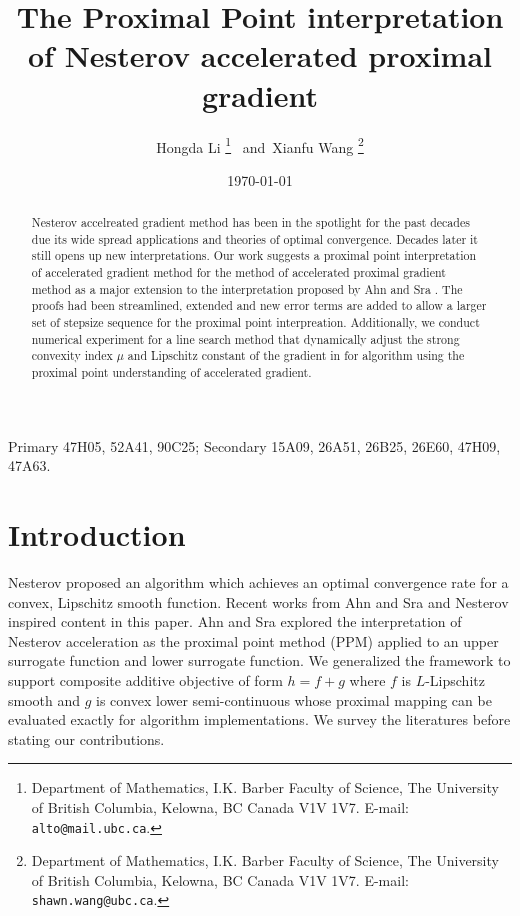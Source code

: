 \documentclass[12pt]{article}
\begin{document}
\title{{\selectfont The Proximal Point interpretation of Nesterov accelerated proximal gradient}}

\author{
    Hongda Li
    \thanks{Department of Mathematics, I.K. Barber Faculty of Science,
    The University of British Columbia, Kelowna, BC Canada V1V 1V7. E-mail:  \texttt{alto@mail.ubc.ca}.}~ and~Xianfu Wang
    \thanks{Department of Mathematics, I.K. Barber Faculty of Science,
    The University of British Columbia, Kelowna, BC Canada V1V 1V7. E-mail:  \texttt{shawn.wang@ubc.ca}.}
}

\date{\today}

\maketitle


\begin{abstract} 
    \noindent
    Nesterov accelreated gradient method has been in the spotlight for the past decades due its wide spread applications and theories of optimal convergence. 
    Decades later it still opens up new interpretations. 
    Our work suggests a proximal point interpretation of accelerated gradient method for the method of accelerated proximal gradient method as a major extension to the interpretation proposed by Ahn and Sra \cite{ahn_understanding_2022}. 
    The proofs had been streamlined, extended and new error terms are added to allow a larger set of stepsize sequence for the proximal point interpreation. 
    Additionally, we conduct numerical experiment for a line search method that dynamically adjust the strong convexity index $\mu$ and Lipschitz constant of the gradient in for algorithm  using the proximal point understanding of accelerated gradient. 
    
\end{abstract}

Primary 47H05, 52A41, 90C25; Secondary 15A09, 26A51, 26B25, 26E60, 47H09, 47A63.

\section{Introduction}
    
    Nesterov \cite{nesterov_method_1983} proposed an algorithm which achieves an optimal convergence rate for a convex, Lipschitz smooth function. 
    Recent works from Ahn and Sra \cite{ahn_understanding_2022} and Nesterov \cite{nesterov_lectures_2018} inspired content in this paper.
    Ahn and Sra explored the interpretation of Nesterov acceleration as the proximal point method (PPM) applied to an upper surrogate function and lower surrogate function. 
    We generalized the framework to support composite additive objective of form $h = f + g$ where $f$ is $L$-Lipschitz smooth and $g$ is convex lower semi-continuous whose proximal mapping can be evaluated exactly for algorithm implementations. 
    We survey the literatures before stating our contributions. 
    
\end{document}
